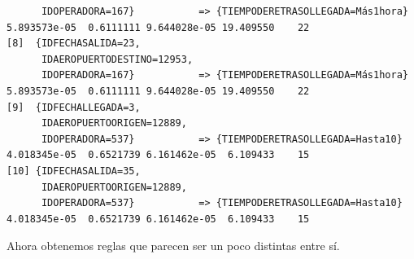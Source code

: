 \documentclass{article}
\begin{document}
\begin{lstlisting}
      IDOPERADORA=167}           => {TIEMPODERETRASOLLEGADA=Más1hora} 5.893573e-05  0.6111111 9.644028e-05 19.409550    22
[8]  {IDFECHASALIDA=23,                                                                                                   
      IDAEROPUERTODESTINO=12953,                                                                                          
      IDOPERADORA=167}           => {TIEMPODERETRASOLLEGADA=Más1hora} 5.893573e-05  0.6111111 9.644028e-05 19.409550    22
[9]  {IDFECHALLEGADA=3,                                                                                                   
      IDAEROPUERTOORIGEN=12889,                                                                                           
      IDOPERADORA=537}           => {TIEMPODERETRASOLLEGADA=Hasta10}  4.018345e-05  0.6521739 6.161462e-05  6.109433    15
[10] {IDFECHASALIDA=35,                                                                                                   
      IDAEROPUERTOORIGEN=12889,                                                                                           
      IDOPERADORA=537}           => {TIEMPODERETRASOLLEGADA=Hasta10}  4.018345e-05  0.6521739 6.161462e-05  6.109433    15
\end{lstlisting}

Ahora obtenemos reglas que parecen ser un poco distintas entre sí. 
\end{document}
